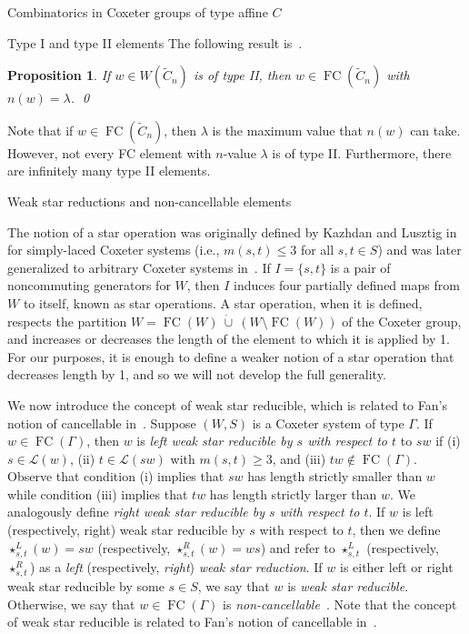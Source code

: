 \documentclass[11pt]{amsart}
\newtheorem{proposition}[theorem]{Proposition}
\theoremstyle{definition}
\numberwithin{equation}{section}
\newcommand{\C}{\widetilde{C}}
\renewcommand{\L}{\mathcal{L}}
\renewcommand{\(}{\left(}
\renewcommand{\)}{\right)}
\DeclareMathOperator{\FC}{FC}
\begin{document}
\begin{section}{Combinatorics in Coxeter groups of type affine $C$}
\begin{subsection}{Type I and type II elements}
The following result is~\cite[Proposition 3.2.3]{Ernst2010}.

\begin{proposition}
If $w \in W(\C_{n})$ is of type II, then $w \in \FC(\C_{n})$ with $n(w)=\lambda$.   \qed
\end{proposition}

Note that if $w \in \FC(\C_{n})$, then $\lambda$ is the maximum value that $n(w)$ can take.  However, not every FC element with $n$-value $\lambda$ is of type II.  Furthermore, there are infinitely many type II elements.  

\end{subsection}


\begin{subsection}{Weak star reductions and non-cancellable elements}\label{subsec:weak star}

The notion of a star operation was originally defined by Kazhdan and Lusztig in~\cite[]{Kazhdan1979} for simply-laced Coxeter systems (i.e., $m(s,t)\leq3$ for all $s,t \in S$) and was later generalized to arbitrary Coxeter systems in~\cite[]{Lusztig1985}.  If $I=\{s,t\}$ is a pair of noncommuting generators for $W$, then $I$ induces four partially defined maps from $W$ to itself, known as star operations. A star operation, when it is defined, respects the partition $W = \FC(W)\ \dot{\cup}\  (W \setminus \FC(W) )$ of the Coxeter group, and increases or decreases the length of the element to which it is applied by 1.  For our purposes, it is enough to define a weaker notion of a star operation that decreases length by 1, and so we will not develop the full generality.  

We now introduce the concept of weak star reducible, which is related to Fan's notion of cancellable in~\cite{Fan1997}.   Suppose $(W,S)$ is a Coxeter system of type $\Gamma$.  If $w \in \FC(\Gamma)$, then $w$ is \emph{left weak star reducible by $s$ with respect to $t$} to $sw$ if (i) $s\in \L(w)$, (ii) $t \in \L(sw)$ with $m(s,t) \geq 3$, and (iii) $tw \notin \FC(\Gamma)$.  Observe that condition (i) implies that $sw$ has length strictly smaller than $w$ while condition (iii) implies that $tw$ has length strictly larger than $w$.  We analogously define \emph{right weak star reducible by $s$ with respect to $t$}.  If $w$ is left (respectively, right) weak star reducible by $s$ with respect to $t$, then we define $\star^{L}_{s,t}(w)=sw$ (respectively, $\star^{R}_{s,t}(w)=ws$) and refer to $\star_{s,t}^{L}$ (respectively, $\star_{s,t}^{R}$) as a \emph{left} (respectively, \emph{right}) \emph{weak star reduction}.  If $w$ is either left or right weak star reducible by some $s\in S$, we say that $w$ is \emph{weak star reducible}.  Otherwise, we say that $w\in \FC(\Gamma)$ is \emph{non-cancellable}~\cite{Ernst2010}.  Note that the concept of weak star reducible is related to Fan's notion of cancellable in~\cite{Fan1997}.  


\end{subsection}
\end{section}
\end{document}
